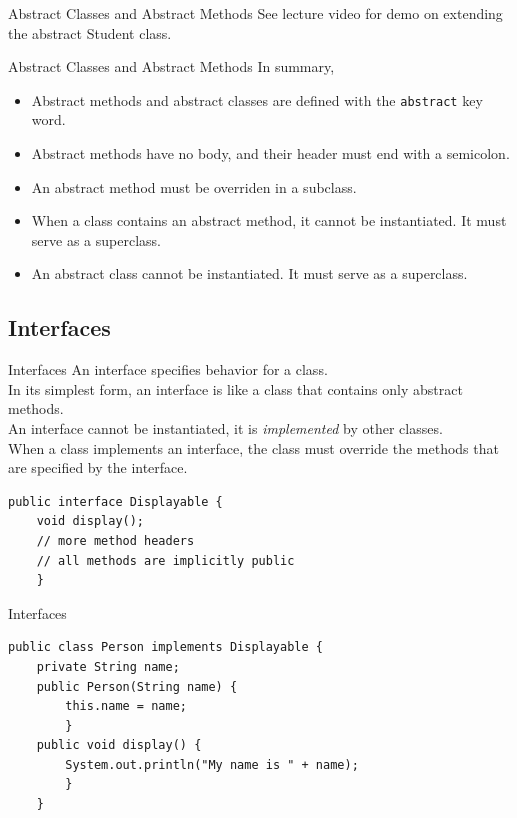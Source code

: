 \documentclass[11pt]{beamer}
\begin{document}
\begin{frame}{Abstract Classes and Abstract Methods}
    See lecture video for demo on extending the abstract Student class.
\end{frame}

\begin{frame}{Abstract Classes and Abstract Methods}
    In summary,
    \begin{itemize}
        \item Abstract methods and abstract classes are defined with the \texttt{abstract} key word.
        \item Abstract methods have no body, and their header must end with a semicolon.
        \item An abstract method must be overriden in a subclass.
        \item When a class contains an abstract method, it cannot be instantiated. It must serve as a superclass.
        \item An abstract class cannot be instantiated. It must serve as a superclass.
    \end{itemize}
\end{frame}

\subsection{Interfaces}
\begin{frame}[fragile]{Interfaces}
    An interface specifies behavior for a class. \\ \vspace{1em}
    In its simplest form, an interface is like a class that contains only abstract methods. \\ \vspace{1em}
    An interface cannot be instantiated, it is \textit{implemented} by other classes. \\ \vspace{1em}
    When a class implements an interface, the class must override the methods that are specified by the interface.
    \begin{lstlisting}
public interface Displayable {
    void display();
    // more method headers
    // all methods are implicitly public
    }
    \end{lstlisting}
\end{frame}

\begin{frame}[fragile]{Interfaces}
    \begin{lstlisting}
public class Person implements Displayable {
    private String name;
    public Person(String name) {
        this.name = name;
        }
    public void display() {
        System.out.println("My name is " + name);
        }
    }
    \end{lstlisting}
\end{frame}
\end{document}
